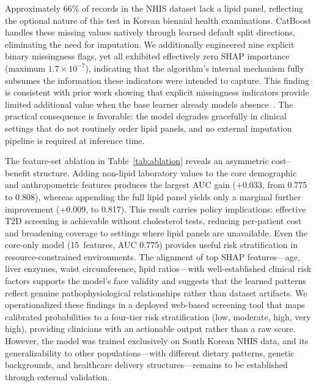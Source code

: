 Approximately 66\% of records in the NHIS dataset lack a lipid panel, reflecting the optional nature of this test in Korean biennial health examinations.
CatBoost handles these missing values natively through learned default split directions, eliminating the need for imputation.
We additionally engineered nine explicit binary missingness flags, yet all exhibited effectively zero SHAP importance (maximum $1.7 \times 10^{-7}$), indicating that the algorithm's internal mechanism fully subsumes the information these indicators were intended to capture.
This finding is consistent with prior work showing that explicit missingness indicators provide limited additional value when the base learner already models absence~\cite{Singh2021missingness, Sisk2023imputation}.
The practical consequence is favorable: the model degrades gracefully in clinical settings that do not routinely order lipid panels, and no external imputation pipeline is required at inference time.

The feature-set ablation in Table~\ref{tab:ablation} reveals an asymmetric cost--benefit structure.
Adding non-lipid laboratory values to the core demographic and anthropometric features produces the largest AUC gain (+0.033, from 0.775 to 0.808), whereas appending the full lipid panel yields only a marginal further improvement (+0.009, to 0.817).
This result carries policy implications: effective T2D screening is achievable without cholesterol tests, reducing per-patient cost and broadening coverage to settings where lipid panels are unavailable.
Even the core-only model (15~features, AUC 0.775) provides useful risk stratification in resource-constrained environments.
The alignment of top SHAP features---age, liver enzymes, waist circumference, lipid ratios---with well-established clinical risk factors supports the model's face validity and suggests that the learned patterns reflect genuine pathophysiological relationships rather than dataset artifacts.
We operationalized these findings in a deployed web-based screening tool that maps calibrated probabilities to a four-tier risk stratification (low, moderate, high, very high), providing clinicians with an actionable output rather than a raw score.
However, the model was trained exclusively on South Korean NHIS data, and its generalizability to other populations---with different dietary patterns, genetic backgrounds, and healthcare delivery structures---remains to be established through external validation.
